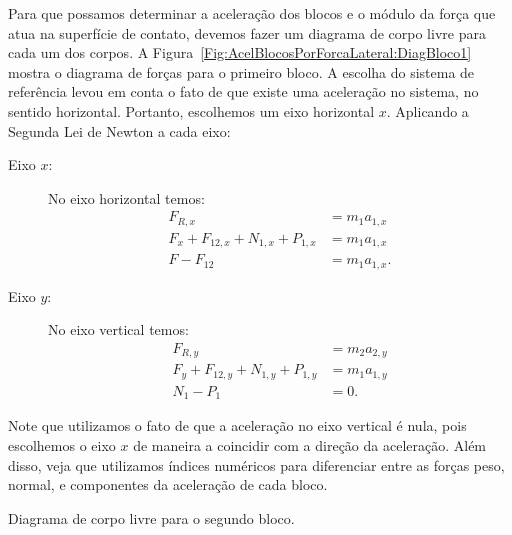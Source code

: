 Para que possamos determinar a aceleração dos blocos e o módulo da força que atua na superfície de contato, devemos fazer um diagrama de corpo livre para cada um dos corpos. A Figura~\ref{Fig:AcelBlocosPorForcaLateral:DiagBloco1} mostra o diagrama de forças para o primeiro bloco. A escolha do sistema de referência levou em conta o fato de que existe uma aceleração no sistema, no sentido horizontal. Portanto, escolhemos um eixo horizontal $x$. Aplicando a Segunda Lei de Newton a cada eixo:
\begin{description}
    \item[Eixo $x$:] No eixo horizontal temos:
        \begin{align}
            F_{R, x} &= m_1 a_{1,x} \\
            F_x + F_{12,x} + N_{1,x} + P_{1,x} &= m_1 a_{1,x} \\
            F - F_{12} &= m_1 a_{1,x}.
        \end{align}
    \item[Eixo $y$:] No eixo vertical temos:
        \begin{align}
            F_{R, y} &= m_2 a_{2,y} \\
            F_y + F_{12,y} + N_{1,y} + P_{1,y} &= m_1 a_{1,y} \\
            N_1 - P_1 &= 0.
        \end{align}
\end{description}
%
Note que utilizamos o fato de que a aceleração no eixo vertical é nula, pois escolhemos o eixo $x$ de maneira a coincidir com a direção da aceleração. Além disso, veja que utilizamos índices numéricos para diferenciar entre as forças peso, normal, e componentes da aceleração de cada bloco. 

\begin{marginfigure}
\centering
{}
\caption{Diagrama de corpo livre para o segundo bloco.\label{Fig:AcelBlocosPorForcaLateral:DiagBloco2}}
\end{marginfigure}


